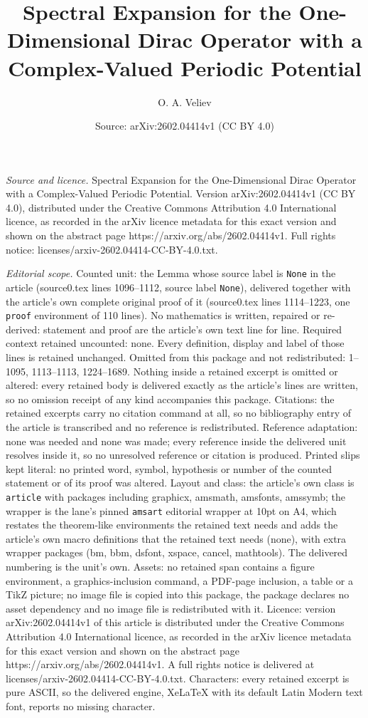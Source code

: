 \documentclass[10pt,a4paper]{amsart}
\title[Spectral Expansion for the One-Dimensional Dirac Operator wi]{Spectral Expansion for the One-Dimensional Dirac Operator with a Complex-Valued Periodic Potential}
\author{O. A. Veliev}
\date{Source: arXiv:2602.04414v1 (CC BY 4.0)}
\begin{document}
\maketitle

\noindent\emph{Source and licence.} Spectral Expansion for the One-Dimensional Dirac Operator with a Complex-Valued Periodic Potential. Version arXiv:2602.04414v1 (CC BY 4.0), distributed under the Creative Commons Attribution 4.0 International licence, as recorded in the arXiv licence metadata for this exact version and shown on the abstract page https://arxiv.org/abs/2602.04414v1. Full rights notice: licenses/arxiv-2602.04414-CC-BY-4.0.txt.\par\smallskip

\noindent\textit{Editorial scope.} Counted unit: the Lemma whose source label is \texttt{None} in the article (source0.tex lines 1096--1112, source label \texttt{None}), delivered together with the article's own complete original proof of it (source0.tex lines 1114--1223, one \texttt{proof} environment of 110 lines). No mathematics is written, repaired or re-derived: statement and proof are the article's own text line for line. Required context retained uncounted: none. Every definition, display and label of those lines is retained unchanged. Omitted from this package and not redistributed: 1--1095, 1113--1113, 1224--1689. Nothing inside a retained excerpt is omitted or altered: every retained body is delivered exactly as the article's lines are written, so no omission receipt of any kind accompanies this package. Citations: the retained excerpts carry no citation command at all, so no bibliography entry of the article is transcribed and no reference is redistributed. Reference adaptation: none was needed and none was made; every reference inside the delivered unit resolves inside it, so no unresolved reference or citation is produced. Printed slips kept literal: no printed word, symbol, hypothesis or number of the counted statement or of its proof was altered. Layout and class: the article's own class is \texttt{article} with packages including graphicx, amsmath, amsfonts, amssymb; the wrapper is the lane's pinned \texttt{amsart} editorial wrapper at 10pt on A4, which restates the theorem-like environments the retained text needs and adds the article's own macro definitions that the retained text needs (none), with extra wrapper packages (bm, bbm, dsfont, xspace, cancel, mathtools). The delivered numbering is the unit's own. Assets: no retained span contains a figure environment, a graphics-inclusion command, a PDF-page inclusion, a table or a TikZ picture; no image file is copied into this package, the package declares no asset dependency and no image file is redistributed with it. Licence: version arXiv:2602.04414v1 of this article is distributed under the Creative Commons Attribution 4.0 International licence, as recorded in the arXiv licence metadata for this exact version and shown on the abstract page https://arxiv.org/abs/2602.04414v1. A full rights notice is delivered at licenses/arxiv-2602.04414-CC-BY-4.0.txt. Characters: every retained excerpt is pure ASCII, so the delivered engine, XeLaTeX with its default Latin Modern text font, reports no missing character.
\end{document}
